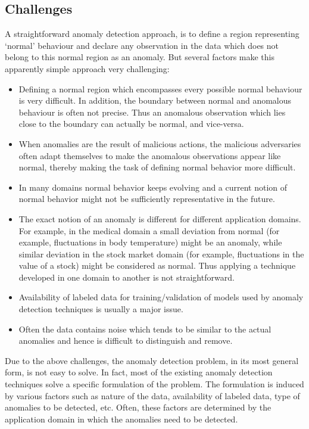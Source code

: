 \subsection{Challenges}
\label{anomalyDetection:challenges}
A straightforward anomaly detection approach, is to define a region representing
`normal' behaviour and declare any observation in the data which does not belong
to this normal region as an anomaly. But several factors make this apparently
simple approach very challenging:

\begin{itemize}

\item Defining a normal region which encompasses every possible normal behaviour
is very difficult. In addition, the boundary between normal and anomalous
behaviour is often not precise. Thus an anomalous observation which lies close
to the boundary can actually be normal, and vice-versa.

\item When anomalies are the result of malicious actions, the malicious
adversaries often adapt themselves to make the anomalous observations appear
like normal, thereby making the task of defining normal behavior more difficult.

\item In many domains normal behavior keeps evolving and a current notion of
normal behavior might not be sufficiently representative in the future.

\item The exact notion of an anomaly is different for different application
domains. For example, in the medical domain a small deviation from normal (for
example, fluctuations in body temperature) might be an anomaly, while similar
deviation in the stock market domain (for example, fluctuations in the value of
a stock) might be considered as normal. Thus applying a technique developed in
one domain to another is not straightforward.

\item Availability of labeled data for training/validation of models used by
anomaly detection techniques is usually a major issue.

\item Often the data contains noise which tends to be similar to the actual
anomalies and hence is difficult to distinguish and remove.

\end{itemize}

Due to the above challenges, the anomaly detection problem, in its most general
form, is not easy to solve. In fact, most of the existing anomaly detection
techniques solve a specific formulation of the problem. The formulation is
induced by various factors such as nature of the data, availability of labeled
data, type of anomalies to be detected, etc. Often, these factors are determined
by the application domain in which the anomalies need to be detected.

